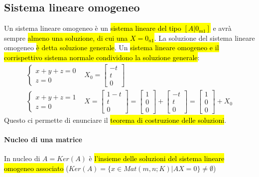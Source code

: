 \documentclass[a4paper,12pt,oneside]{article}
\begin{document}
\subsection{Sistema lineare omogeneo}
Un sistema lineare omogeneo è un \hl{sistema lineare del tipo $[A|0_{m1}]$} e avrà
sempre \hl{almeno una soluzione, di cui una $X=0_{n1}$}. La soluzione del sistema
lineare omogeneo \hl{è detta soluzione generale}. Un \hl{sistema lineare omogeneo e
il corrispettivo sistema normale condividono la soluzione generale}:
\begin{align*}
    \begin{cases}
        x + y + z = 0 \\
        z = 0
    \end{cases} & X_0 =
    \begin{bmatrix}
        -t \\
        t \\
        0
    \end{bmatrix} \\
    \begin{cases}
        x + y + z = 1 \\
        z = 0
    \end{cases} & X =
    \begin{bmatrix}
        1-t \\
        t \\
        0
    \end{bmatrix} =
    \begin{bmatrix}
        1 \\
        0 \\
        0
    \end{bmatrix} +
    \begin{bmatrix}
        -t \\
        t \\
        0
    \end{bmatrix} =
    \begin{bmatrix}
        1 \\
        0 \\
        0
    \end{bmatrix} + X_0
\end{align*}
Questo ci permette di enunciare il \hl{teorema di costruzione delle soluzioni}.

\paragraph{Nucleo di una matrice} In nucleo di $A = Ker(A)$ è \hl{l'insieme delle
soluzioni del sistema lineare omogeneo associato}
($Ker(A) = \{x \in Mat(m,n;K) | AX = 0\} \neq \emptyset$)
\end{document}
